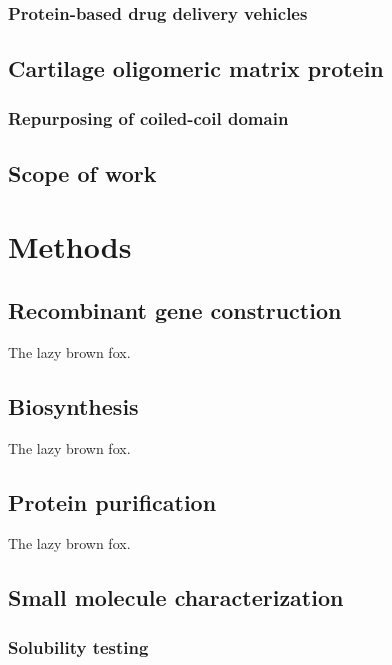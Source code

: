 \begin{refsection}
\subsubsection{Protein-based drug delivery vehicles}

\subsection{Cartilage oligomeric matrix protein}

\subsubsection{Repurposing of coiled-coil domain}

\subsection{Scope of work}


\section{Methods}

\subsection{Recombinant gene construction}

The lazy brown fox.

\subsection{Biosynthesis}

The lazy brown fox.

\subsection{Protein purification}

The lazy brown fox.

\subsection{Small molecule characterization}

\subsubsection{Solubility testing}


\end{refsection}
